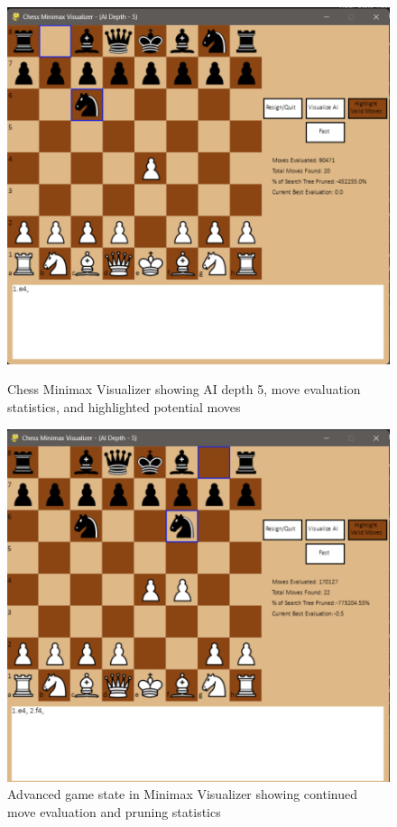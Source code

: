 \documentclass[11pt,a4paper]{report}
\begin{document}
\begin{figure}[H]
    \centering
    \begin{minipage}{0.48\textwidth}
        \centering
        \includegraphics[width=\textwidth]{images/move_1.png}
        \caption{Chess Minimax Visualizer showing AI depth 5, move evaluation statistics, and highlighted potential moves}
        \label{fig:move1}
    \end{minipage}
    \hfill
    \begin{minipage}{0.48\textwidth}
        \centering
        \includegraphics[width=\textwidth]{images/move_2.png}
        \caption{Advanced game state in Minimax Visualizer showing continued move evaluation and pruning statistics}
        \label{fig:move2}
    \end{minipage}
\end{figure}
\end{document}
